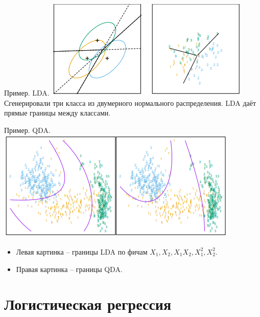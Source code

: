 \documentclass[9pt]{beamer}
\begin{document}
\begin{frame}{Пример. LDA.}
\includegraphics[width=\textwidth]{img/lda.png}
Сгенерировали три класса из двумерного нормального распределения. LDA даёт прямые границы между классами.
\end{frame}

\begin{frame}{Пример. QDA.}
\includegraphics[width=\textwidth]{img/lda_qda.png}
\begin{itemize}
    \item Левая картинка -- границы LDA по фичам $X_1, X_2, X_1X_2, X_1^2, X_2^2$.
    \item Правая картинка -- границы QDA. 
\end{itemize}
\end{frame}

\section{Логистическая регрессия}
\end{document}
